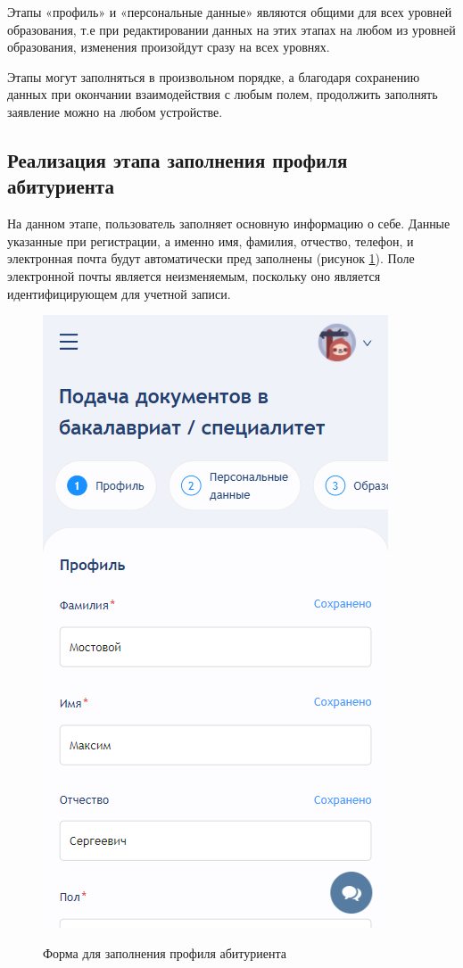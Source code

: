 Этапы «профиль» и «персональные данные» являются общими для всех уровней образования, т.е при редактировании данных на этих этапах на любом из уровней образования, изменения произойдут сразу на всех уровнях.

Этапы могут заполняться в произвольном порядке, а благодаря сохранению данных при окончании взаимодействия с любым полем, продолжить заполнять заявление можно на любом устройстве.

\subsection{Реализация этапа заполнения профиля абитуриента}

На данном этапе, пользователь заполняет основную информацию о себе. Данные указанные при регистрации, а именно имя, фамилия, отчество, телефон, и электронная почта будут автоматически пред заполнены (рисунок \ref{fig:profilestep}). Поле электронной почты является неизменяемым, поскольку оно является идентифицирующем для учетной записи.

\begin{figure}[H]
\begin{center}
\includegraphics[width=0.5\hsize]{fig/profile-step.png}\\[2mm]
\caption{Форма для заполнения профиля абитуриента}\label{fig:profilestep}
\end{center}
\end{figure}

